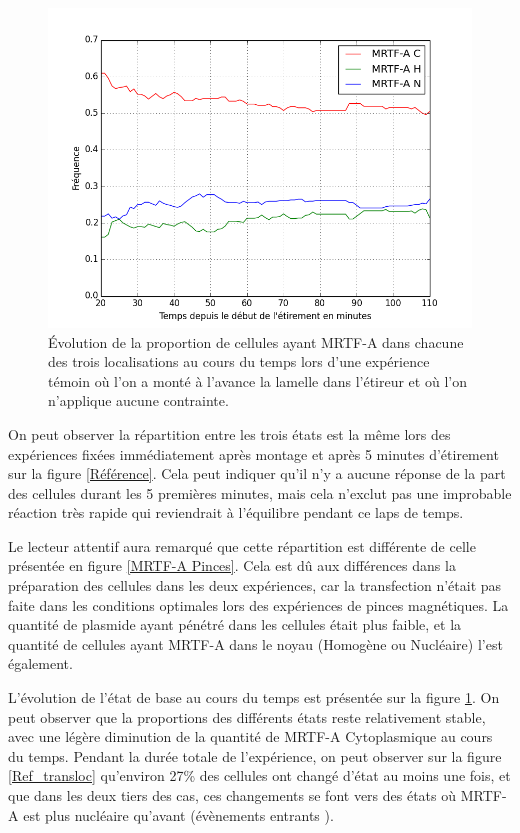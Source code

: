 \begin{figure}
\includegraphics[scale=0.4]{Figures/CHN_vs_Temps_reference.png} 
\caption{\label{Reference_dynamique} \'E{}volution de la proportion de cellules ayant MRTF-A dans chacune des trois localisations au cours du temps lors d'une expérience témoin où l'on a monté à l'avance la lamelle dans l'étireur et où l'on n'applique aucune contrainte.}
\end{figure}

On peut observer la répartition entre les trois états est la même lors des expériences fixées immédiatement après montage et après 5 minutes d'étirement sur la figure \ref{Référence}.
Cela peut indiquer qu'il n'y a aucune réponse de la part des cellules durant les 5 premières minutes, mais cela n'exclut pas une improbable réaction très rapide qui reviendrait à l'équilibre pendant ce laps de temps. 

Le lecteur attentif aura remarqué que cette répartition est différente de celle présentée en figure \ref{MRTF-A Pinces}. 
Cela est dû aux différences dans la préparation des cellules dans les deux expériences, car la transfection n'était pas faite dans les conditions optimales lors des expériences de pinces magnétiques. 
La quantité de plasmide ayant pénétré dans les cellules était plus faible, et la quantité de cellules ayant MRTF-A dans le noyau (Homogène ou Nucléaire) l'est également. 


L'évolution de l'état de base au cours du temps est présentée sur la figure \ref{Reference_dynamique}. On peut observer que la proportions des différents états reste relativement stable, avec une légère diminution de la quantité de MRTF-A Cytoplasmique au cours du temps. 
Pendant la durée totale de l'expérience, on peut observer sur la figure \ref{Ref_transloc} qu'environ 27\% des cellules ont changé d'état au moins une fois, et que dans les deux tiers des cas, ces changements se font vers des états où MRTF-A est plus nucléaire qu'avant (évènements \og entrants \fg). 


